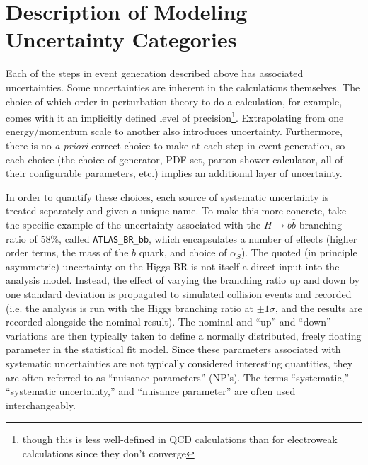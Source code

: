 \section{Description of Modeling Uncertainty Categories}
\label{sec:modsysgen}
Each of the steps in event generation described above has associated uncertainties.  Some uncertainties are inherent in the calculations themselves.  The choice of which order in perturbation theory to do a calculation, for example, comes with it an implicitly defined level of precision\footnote{though this is less well-defined in QCD calculations than for electroweak calculations since they don't converge}.  Extrapolating from one energy/momentum scale to another also introduces uncertainty.  Furthermore, there is no \emph{a priori} correct choice to make at each step in event generation, so each choice (the choice of generator, PDF set, parton shower calculator, all of their configurable parameters, etc.) implies an additional layer of uncertainty.%

In order to quantify these choices, each source of systematic uncertainty is treated separately and given a unique name.  To make this more concrete, take the specific example of the uncertainty associated with the $H\to b\bar{b}$ branching ratio of 58\%, called \texttt{ATLAS\_BR\_bb}, which encapsulates a number of effects (higher order terms, the mass of the $b$ quark, and choice of $\alpha_S$).  The quoted (in principle asymmetric) uncertainty on the Higgs BR is not itself a direct input into the analysis model.  Instead, the effect of varying the branching ratio up and down by one standard deviation is propagated to simulated collision events and recorded (i.e. the analysis is run with the Higgs branching ratio at $\pm1\sigma$, and the results are recorded alongside the nominal result).  The nominal and ``up'' and ``down'' variations are then typically taken to define a normally distributed, freely floating parameter in the statistical fit model.  Since these parameters associated with systematic uncertainties are not typically considered interesting quantities, they are often referred to as ``nuisance parameters'' (NP's).  The terms ``systematic,'' ``systematic uncertainty,'' and ``nuisance parameter'' are often used interchangeably.

